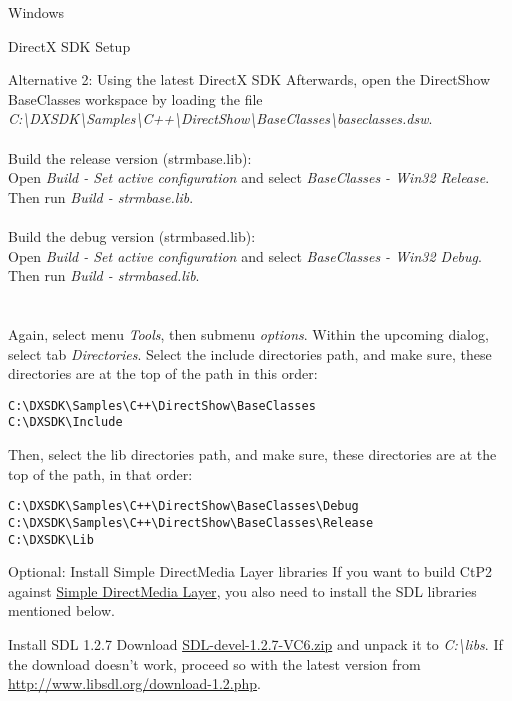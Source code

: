 \begin{section}{Windows}
\begin{subsection}{DirectX SDK Setup}
\begin{subsubsection}{Alternative 2: Using the latest DirectX SDK}
Afterwards, open the DirectShow BaseClasses workspace by loading the file\\ \textit{C:\textbackslash{}DXSDK\textbackslash{}Samples\textbackslash{}C++\textbackslash{}DirectShow\textbackslash{}BaseClasses\textbackslash{}baseclasses.dsw}.\\
\\
Build the release version (strmbase.lib):\\
Open \textit{Build - Set active configuration} and select \textit{BaseClasses - Win32 Release}. Then run \textit{Build - strmbase.lib}.\\
\\
Build the debug version (strmbased.lib):\\
Open \textit{Build - Set active configuration} and select \textit{BaseClasses - Win32 Debug}. Then run \textit{Build - strmbased.lib}.\\
\\
\\
Again, select menu \textit{Tools}, then submenu \textit{options}. Within the upcoming dialog, select tab \textit{Directories}. Select the include directories path, and make sure, these directories are at the top of the path in this order:\\
\begin{verbatim}
C:\DXSDK\Samples\C++\DirectShow\BaseClasses
C:\DXSDK\Include
\end{verbatim}

Then, select the lib directories path, and make sure, these directories are at the top of the path, in that order:\\
\begin{verbatim}
C:\DXSDK\Samples\C++\DirectShow\BaseClasses\Debug
C:\DXSDK\Samples\C++\DirectShow\BaseClasses\Release
C:\DXSDK\Lib
\end{verbatim}
\end{subsubsection}%
\end{subsection}%

\begin{subsection}{Optional: Install Simple DirectMedia Layer libraries}
If you want to build CtP2 against \href{http://www.libsdl.org}{Simple DirectMedia Layer}, you also need to install the SDL libraries mentioned below.

\begin{subsubsection}{Install SDL 1.2.7}
Download \href{http://www.libsdl.org/release/SDL-devel-1.2.7-VC6.zip}{SDL-devel-1.2.7-VC6.zip} and unpack it to \textit{C:\textbackslash{}libs}.
If the download doesn't work, proceed so with the latest version from \href{http://www.libsdl.org/download-1.2.php}{http://www.libsdl.org/download-1.2.php}.
\end{subsubsection}%


\end{subsection}
\end{section}
